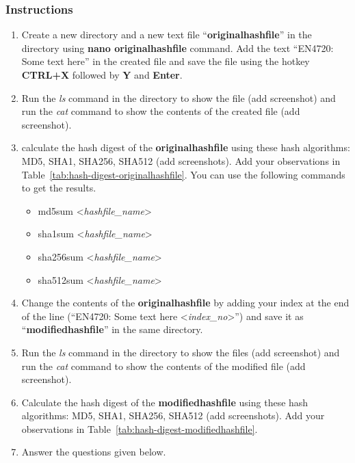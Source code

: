 \documentclass[11pt,letterpaper]{article}
\begin{document}
	\subsubsection*{Instructions}
	\begin{enumerate}
		\item Create a new directory and a new text file ``\textbf{originalhashfile}'' in the directory using \textbf{nano originalhashfile} command. Add the text ``EN4720: Some text here'' in the created file and save the file using the hotkey \textbf{CTRL+X} followed by \textbf{Y} and \textbf{Enter}.
		
		\item Run the \textit{ls} command in the directory to show the file (add screenshot) and run the \textit{cat} command to show the contents of the created file (add screenshot).
		
		\item calculate the hash digest of the \textbf{originalhashfile} using these hash algorithms: MD5, SHA1, SHA256, SHA512 (add screenshots). Add your observations in Table~\ref{tab:hash-digest-originalhashfile}. You can use the following commands to get the results.
		\begin{itemize}
			\item md5sum \textless \textit{hashfile\_name}\textgreater
			\item sha1sum \textless \textit{hashfile\_name}\textgreater
			\item sha256sum \textless \textit{hashfile\_name}\textgreater
			\item sha512sum \textless \textit{hashfile\_name}\textgreater
		\end{itemize}
		
		\item Change the contents of the \textbf{originalhashfile} by adding your index at the end of the line (``EN4720: Some text here \textless\textit{index\_no}\textgreater'') and save it as ``\textbf{modifiedhashfile}'' in the same directory.
		
		\item Run the \textit{ls} command in the directory to show the files (add screenshot) and run the \textit{cat} command to show the contents of the modified file (add screenshot).
		
		\item Calculate the hash digest of the \textbf{modifiedhashfile} using these hash algorithms: MD5, SHA1, SHA256, SHA512 (add screenshots). Add your observations in Table~\ref{tab:hash-digest-modifiedhashfile}.
		
		\item Answer the questions given below.
		
	\end{enumerate}
	\newpage
\end{document}
